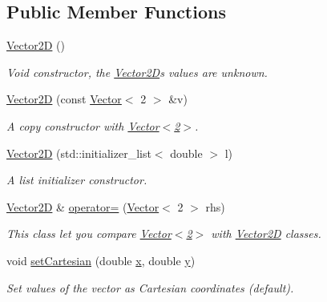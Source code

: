 \subsection*{Public Member Functions}
\begin{DoxyCompactItemize}
\item 
\hyperlink{classzbe_1_1_vector2_d_a085719c80fc6468b80d8a5dd826b2cff}{Vector2\+D} ()
\begin{DoxyCompactList}\small\item\em Void constructor, the \hyperlink{classzbe_1_1_vector2_d}{Vector2\+D}\textquotesingle{}s values are unknown. \end{DoxyCompactList}\item 
\hyperlink{classzbe_1_1_vector2_d_a57f408da0866b7a65ba4afddbd12296b}{Vector2\+D} (const \hyperlink{classzbe_1_1_vector}{Vector}$<$ 2 $>$ \&v)
\begin{DoxyCompactList}\small\item\em A copy constructor with \hyperlink{classzbe_1_1_vector}{Vector$<$2$>$}. \end{DoxyCompactList}\item 
\hyperlink{classzbe_1_1_vector2_d_a5d0db3d7f9488739deece6ba1c0abd72}{Vector2\+D} (std\+::initializer\+\_\+list$<$ double $>$ l)
\begin{DoxyCompactList}\small\item\em A list initializer constructor. \end{DoxyCompactList}\item 
\hyperlink{classzbe_1_1_vector2_d}{Vector2\+D} \& \hyperlink{classzbe_1_1_vector2_d_aeaace85ca8133f1b56b4ce6b8db0ead1}{operator=} (\hyperlink{classzbe_1_1_vector}{Vector}$<$ 2 $>$ rhs)
\begin{DoxyCompactList}\small\item\em This class let you compare \hyperlink{classzbe_1_1_vector}{Vector$<$2$>$} with \hyperlink{classzbe_1_1_vector2_d}{Vector2\+D} classes. \end{DoxyCompactList}\item 
void \hyperlink{classzbe_1_1_vector2_d_a31df70571e1945f783fbcffdba992b16}{set\+Cartesian} (double \hyperlink{classzbe_1_1_vector2_d_a66e8c7ff408370756e48e2fd5f211b4e}{x}, double \hyperlink{classzbe_1_1_vector2_d_ab36f8d98268760d53da4efb305533cee}{y})
\begin{DoxyCompactList}\small\item\em Set values of the vector as Cartesian coordinates (default). \end{DoxyCompactList}\item 

\end{DoxyCompactItemize}
